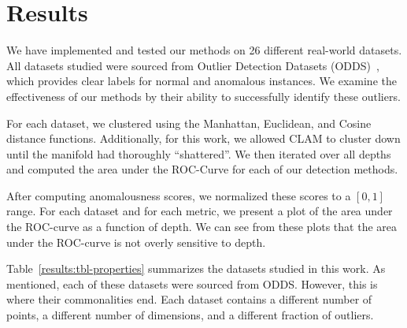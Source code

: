 \section{Results}
\label{sec:results}

We have implemented and tested our methods on 26 different real-world datasets.
All datasets studied were sourced from Outlier Detection Datasets (ODDS)~\cite{rayana2016odds}, which provides clear labels for normal and anomalous instances.
We examine the effectiveness of our methods by their ability to successfully identify these outliers.

For each dataset, we clustered using the Manhattan, Euclidean, and Cosine distance functions.
Additionally, for this work, we allowed CLAM to cluster down until the manifold had thoroughly ``shattered''.
We then iterated over all depths and computed the area under the ROC-Curve for each of our detection methods.

After computing anomalousness scores, we normalized these scores to a $[0, 1]$ range.
For each dataset and for each metric, we present a plot of the area under the ROC-curve as a function of depth.
We can see from these plots that the area under the ROC-curve is not overly sensitive to depth.

Table~\ref{results:tbl-properties} summarizes the datasets studied in this work.
As mentioned, each of these datasets were sourced from ODDS.
However, this is where their commonalities end.
Each dataset contains a different number of points, a different number of dimensions, and a different fraction of outliers.

